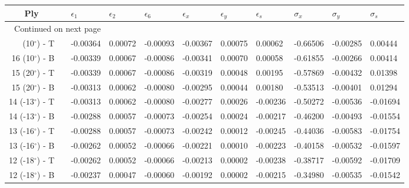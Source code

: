 \begin{table}[H]
\caption{Stresses are in [GPa].}
\begin{longtable}{@{}rllllllllll@{}}
\toprule
                 \multicolumn{1}{c}{Ply} &\phantom{a}&  $\epsilon_1$ &  $\epsilon_2$ &  $\epsilon_6$ &  $\epsilon_x$ &  $\epsilon_y$ &  $\epsilon_s$ &  $\sigma_x$ &  $\sigma_y$ &  $\sigma_s$ \\
\midrule
\endhead
\midrule
\multicolumn{3}{r}{{Continued on next page}} \\
\midrule
\endfoot

\bottomrule
\endlastfoot
  16 (10$^\circ$) - T &&      -0.00364 &       0.00072 &      -0.00093 &      -0.00367 &       0.00075 &       0.00062 &    -0.66506 &    -0.00285 &     0.00444 \\
  16 (10$^\circ$) - B &&      -0.00339 &       0.00067 &      -0.00086 &      -0.00341 &       0.00070 &       0.00058 &    -0.61855 &    -0.00266 &     0.00414 \\\midrule
  15 (20$^\circ$) - T &&      -0.00339 &       0.00067 &      -0.00086 &      -0.00319 &       0.00048 &       0.00195 &    -0.57869 &    -0.00432 &     0.01398 \\
  15 (20$^\circ$) - B &&      -0.00313 &       0.00062 &      -0.00080 &      -0.00295 &       0.00044 &       0.00180 &    -0.53513 &    -0.00401 &     0.01294 \\\midrule
 14 (-13$^\circ$) - T &&      -0.00313 &       0.00062 &      -0.00080 &      -0.00277 &       0.00026 &      -0.00236 &    -0.50272 &    -0.00536 &    -0.01694 \\
 14 (-13$^\circ$) - B &&      -0.00288 &       0.00057 &      -0.00073 &      -0.00254 &       0.00024 &      -0.00217 &    -0.46200 &    -0.00493 &    -0.01554 \\\midrule
 13 (-16$^\circ$) - T &&      -0.00288 &       0.00057 &      -0.00073 &      -0.00242 &       0.00012 &      -0.00245 &    -0.44036 &    -0.00583 &    -0.01754 \\
 13 (-16$^\circ$) - B &&      -0.00262 &       0.00052 &      -0.00066 &      -0.00221 &       0.00010 &      -0.00223 &    -0.40158 &    -0.00532 &    -0.01597 \\\midrule
 12 (-18$^\circ$) - T &&      -0.00262 &       0.00052 &      -0.00066 &      -0.00213 &       0.00002 &      -0.00238 &    -0.38717 &    -0.00592 &    -0.01709 \\
 12 (-18$^\circ$) - B &&      -0.00237 &       0.00047 &      -0.00060 &      -0.00192 &       0.00002 &      -0.00215 &    -0.34980 &    -0.00535 &    -0.01542 \\\midrule

\end{longtable}
\end{table}
